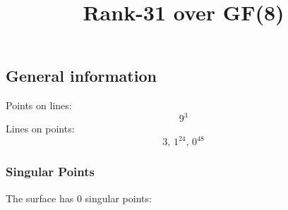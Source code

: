 \documentclass{article}
\newcommand\setTBstruts{\def\T{\rule{0pt}{2.6ex}}%
\def\B{\rule[-1.2ex]{0pt}{0pt}}}
\begin{document}
 
\setTBstruts



{\allowdisplaybreaks%






\title{Rank-31 over GF(8)}
\author{}%
\maketitle%
%
{}



\subsection*{General information}
Points on lines:
$$
9^3$$
Lines on points:
$$
3,\,1^{24},\,0^{48}$$
\subsubsection*{Singular Points}
The surface has 0 singular points:\\
\begin{align*}
\end{align*}
}
\end{document}
